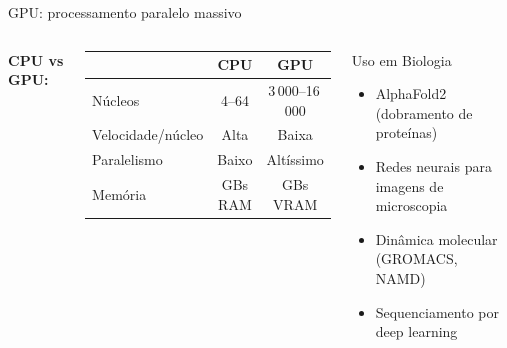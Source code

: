 \begin{frame}[shrink=5]{GPU: processamento paralelo massivo}

\vspace{0.3cm}

\begin{columns}
\textbf{CPU vs GPU:}
\begin{center}
\begin{tabular}{lcc}
\toprule
& \textbf{CPU} & \textbf{GPU} \\
\midrule
Núcleos & 4--64 & 3\,000--16\,000 \\
Velocidade/núcleo & Alta & Baixa \\
Paralelismo & Baixo & Altíssimo \\
Memória & GBs RAM & GBs VRAM \\
\bottomrule
\end{tabular}
\end{center}

\begin{exampleblock}{Uso em Biologia}
\begin{itemize}
    \item AlphaFold2 (dobramento de proteínas)
    \item Redes neurais para imagens de microscopia
    \item Dinâmica molecular (GROMACS, NAMD)
    \item Sequenciamento por deep learning
\end{itemize}
\end{exampleblock}
\end{columns}
\end{frame}

